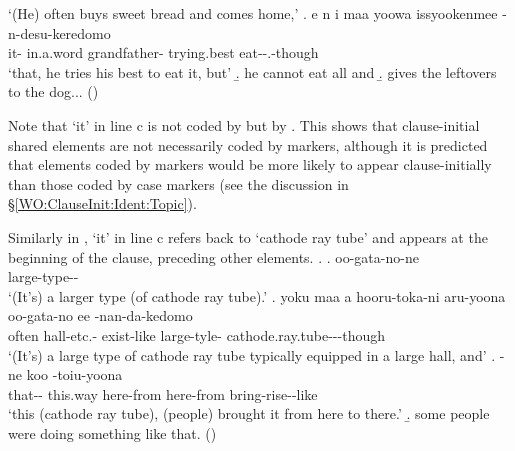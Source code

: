    `(He) often buys sweet bread and comes home,'
 \bg. e n  i maa yoowa  issyookenmee -n-desu-keredomo \\
     it-   in.a.word grandfather- trying.best eat--.-though \\
   `that, he tries his best to eat it, but'
 \b. he cannot eat all and
 \b. gives the leftovers to the dog...
  \hfill{()}
%

Note that  `it' in line c is not coded by  but by .
This shows that clause-initial shared elements are not necessarily coded by  markers,
although it is predicted that elements coded by  markers would be more likely to appear clause-initially than those coded by case markers (see the discussion in \S \ref{WO:ClauseInit:Ident:Topic}).

\largerpage
Similarly in \Next,
 `it' in line c refers back to  `cathode ray tube'
and appears at the beginning of the clause,
preceding other elements.
%
\ex.\label{PronIni2}
 \ag. oo-gata-no-ne \\
   large-type-- \\
   `(It's) a larger type (of cathode ray tube).'
 \bg. yoku maa a hooru-toka-ni aru-yoona oo-gata-no ee {}-nan-da-kedomo \\
   often   hall-etc.- exist-like large-tyle-  cathode.ray.tube---though \\
   `(It's) a large type of cathode ray tube typically equipped in a large hall, and'
 \bg. -ne koo   -toiu-yoona \\
  that-- this.way here-from here-from bring-rise--like \\
  `this (cathode ray tube), (people) brought it from here to there.'
  \b. some people were doing something like that.
   \hfill{()}

